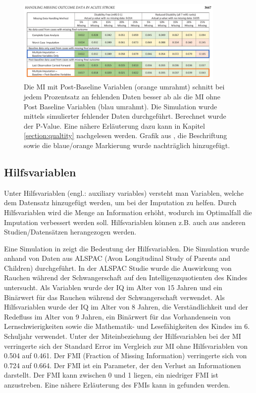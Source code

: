   \begin{figure}[t]
	\centering
	\includegraphics[width=0.9\textwidth]{images/grafik_saver.png}
	\caption{
		Die MI mit Post-Baseline Variablen (orange umrahmt) schnitt bei jedem Prozentsatz an fehlenden Daten besser ab als 
		die MI ohne Post Baseline Variablen (blau umrahmt). Die Simulation wurde mittels simulierter fehlender Daten durchgeführt. Berechnet wurde der P-Value.
		Eine nähere Erläuterung dazu kann in Kapitel \ref{section:qualtity} nachgelesen werden. 
		Grafik aus \textcite[3667]{Young-Saver2018}, die Beschriftung sowie die blaue/orange Markierung wurde nachträglich 
		hinzugefügt.
	}
	\label{figure:study}
\end{figure}

\subsection{Hilfsvariablen}

Unter Hilfsvariablen (engl.: auxiliary variables) versteht man Variablen, welche dem Datensatz hinzugefügt werden, um bei der Imputation zu helfen. \autocite[211]{Graham2007}
Durch Hilfsvariablen wird die Menge an Information erhöht, wodurch im Optimalfall die Imputation verbessert werden soll.
Hilfsvariablen können z.B. auch aus anderen Studien/Datensätzen herangezogen werden.

Eine Simulation in \textcite[]{Madley-Dowd2019} zeigt die Bedeutung der Hilfsvariablen. 
Die Simulation wurde anhand von Daten aus ALSPAC (Avon Longitudinal Study of Parents and Children) 
durchgeführt. In der ALSPAC Studie wurde die Auswirkung von Rauchen während der Schwangerschaft auf den Intelligenzquotienten des Kindes untersucht. Als Variablen wurde
der IQ im Alter von 15 Jahren und ein Binärwert für das Rauchen während der Schwangerschaft verwendet. Als Hilfsvariablen wurde der IQ im Alter von 8 Jahren, die Verständlichkeit 
und der Redefluss im Alter von 9 Jahren, ein Binärwert für das Vorhandensein von Lernschwierigkeiten sowie die Mathematik- und Lesefähigkeiten des Kindes im 6. Schuljahr verwendet. 
Unter der Miteinbeziehung der Hilfsvariablen bei der MI verringerte sich der Standard Error im Vergleich zur MI ohne Hilfsvariablen von 0.504 auf 0.461. Der FMI (Fraction of Missing Information)
verringerte sich von 0.724 auf 0.664. \autocite[71]{Madley-Dowd2019} Der FMI ist ein Parameter, der den Verlust an Informationen darstellt. Der FMI kann zwischen 0 und 1 liegen, 
ein niedriger FMI ist anzustreben.
\autocite[65]{Madley-Dowd2019} Eine nähere Erläuterung des FMIs kann in \textcite[]{Madley-Dowd2019} gefunden werden. 


